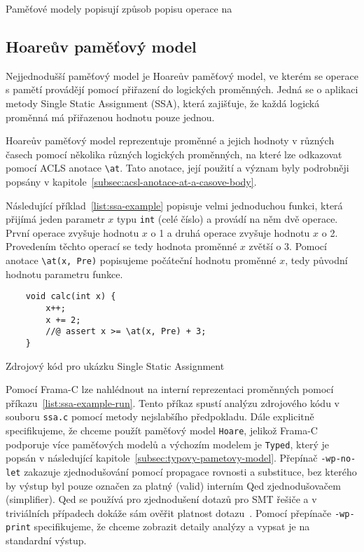 Paměťové modely popisují způsob popisu operace na

\subsection{Hoareův paměťový model}
\label{subsec:hoareuv-pametovy-model}

Nejjednodušší paměťový model je Hoareův paměťový model,
ve kterém se operace s pamětí provádějí pomocí přiřazení do logických proměnných.
Jedná se o aplikaci metody Single Static Assignment (SSA),
která zajišťuje, že každá logická proměnná má přiřazenou hodnotu pouze jednou.

Hoareův paměťový model reprezentuje proměnné a jejich hodnoty v různých časech
pomocí několika různých logických proměnných, na které lze odkazovat pomocí
ACLS anotace \texttt{\textbackslash at}.
Tato anotace, její použití a význam byly podrobněji popsány v kapitole~\ref{subsec:acsl-anotace-at-a-casove-body}.

Následující příklad~\ref{list:ssa-example} popisuje velmi jednoduchou funkci,
která přijímá jeden parametr $x$ typu \texttt{int} (celé číslo) a provádí na něm dvě operace.
První operace zvyšuje hodnotu $x$ o 1 a druhá operace zvyšuje hodnotu $x$ o 2.
Provedením těchto operací se tedy hodnota proměnné $x$ zvětší o 3.
Pomocí anotace \texttt{\textbackslash at(x, Pre)} popisujeme počáteční hodnotu proměnné $x$,
tedy původní hodnotu parametru funkce.

\begin{listing}[H]
    \begin{verbatim}
    void calc(int x) {
        x++;
        x += 2;
        //@ assert x >= \at(x, Pre) + 3;
    }
    \end{verbatim}
    \caption{Zdrojový kód pro ukázku Single Static Assignment}
    \label{list:ssa-example}
\end{listing}

Pomocí Frama\mbox{-}C lze nahlédnout na interní reprezentaci proměnných pomocí příkazu~\ref{list:ssa-example-run}.
Tento příkaz spustí analýzu zdrojového kódu v souboru \texttt{ssa.c} pomocí metody nejslabšího předpokladu.
Dále explicitně specifikujeme, že chceme použít paměťový model \texttt{Hoare},
jelikož Frama\mbox{-}C podporuje více paměťových modelů a výchozím modelem je \texttt{Typed},
který je popsán v následující kapitole~\ref{subsec:typovy-pametovy-model}.
Přepínač \texttt{-wp-no-let} zakazuje zjednodušování pomocí propagace rovnosti a substituce,
bez kterého by výstup byl pouze označen za platný (valid) interním Qed zjednodušovačem (simplifier).
Qed se používá pro zjednodušení dotazů pro SMT řešiče a v triviálních případech dokáže sám ověřit platnost dotazu~\cite{WPManual, BlanchardWP2024}.
Pomocí přepínače \texttt{-wp-print} specifikujeme, že chceme zobrazit detaily analýzy a vypsat je na standardní výstup.

